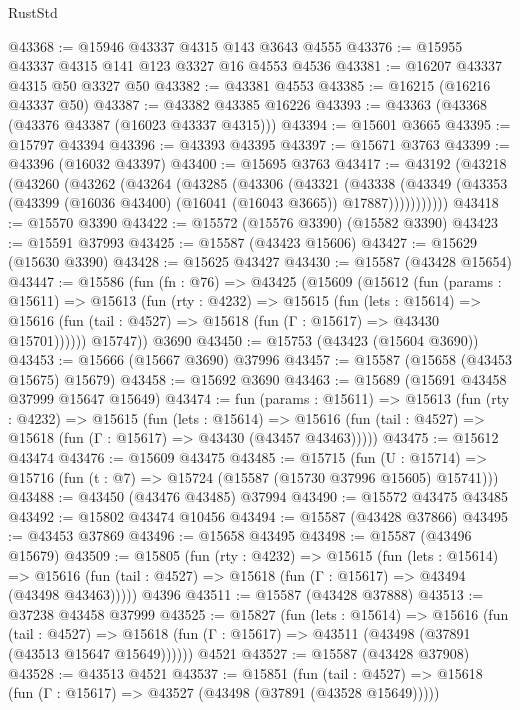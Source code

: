 \begin{lexlean}{RustStd}
\begin{coremodule}
@43368 := @15946 @43337 @4315 @143 @3643 @4555
@43376 := @15955 @43337 @4315 @141 @123 @3327 @16 @4553 @4536
@43381 := @16207 @43337 @4315 @50 @3327 @50
@43382 := @43381 @4553
@43385 := @16215 (@16216 @43337 @50)
@43387 := @43382 @43385 @16226
@43393 := @43363 (@43368 (@43376 @43387 (@16023 @43337 @4315)))
@43394 := @15601 @3665
@43395 := @15797 @43394
@43396 := @43393 @43395
@43397 := @15671 @3763
@43399 := @43396 (@16032 @43397)
@43400 := @15695 @3763
@43417 := @43192
    (@43218
      (@43260
        (@43262
          (@43264
            (@43285
              (@43306
                (@43321
                  (@43338
                    (@43349
                      (@43353 (@43399 (@16036 @43400) (@16041 (@16043 @3665)) @17887)))))))))))
@43418 := @15570 @3390
@43422 := @15572 (@15576 @3390) (@15582 @3390)
@43423 := @15591 @37993
@43425 := @15587 (@43423 @15606)
@43427 := @15629 (@15630 @3390)
@43428 := @15625 @43427
@43430 := @15587 (@43428 @15654)
@43447 := @15586
    (fun (fn : @76) =>
    @43425
      (@15609
        (@15612
          (fun (params : @15611) =>
          @15613
            (fun (rty : @4232) =>
            @15615
              (fun (lets : @15614) =>
              @15616 (fun (tail : @4527) => @15618 (fun (Γ : @15617) => @43430 @15701))))))
        @15747))
    @3690
@43450 := @15753 (@43423 (@15604 @3690))
@43453 := @15666 (@15667 @3690) @37996
@43457 := @15587 (@15658 (@43453 @15675) @15679)
@43458 := @15692 @3690
@43463 := @15689 (@15691 @43458 @37999 @15647 @15649)
@43474 := fun (params : @15611) =>
  @15613
    (fun (rty : @4232) =>
    @15615
      (fun (lets : @15614) =>
      @15616 (fun (tail : @4527) => @15618 (fun (Γ : @15617) => @43430 (@43457 @43463)))))
@43475 := @15612 @43474
@43476 := @15609 @43475
@43485 := @15715
    (fun (U : @15714) => @15716 (fun (t : @7) => @15724 (@15587 (@15730 @37996 @15605) @15741)))
@43488 := @43450 (@43476 @43485) @37994
@43490 := @15572 @43475 @43485
@43492 := @15802 @43474 @10456
@43494 := @15587 (@43428 @37866)
@43495 := @43453 @37869
@43496 := @15658 @43495
@43498 := @15587 (@43496 @15679)
@43509 := @15805
    (fun (rty : @4232) =>
    @15615
      (fun (lets : @15614) =>
      @15616 (fun (tail : @4527) => @15618 (fun (Γ : @15617) => @43494 (@43498 @43463)))))
    @4396
@43511 := @15587 (@43428 @37888)
@43513 := @37238 @43458 @37999
@43525 := @15827
    (fun (lets : @15614) =>
    @15616
      (fun (tail : @4527) =>
      @15618 (fun (Γ : @15617) => @43511 (@43498 (@37891 (@43513 @15647 @15649))))))
    @4521
@43527 := @15587 (@43428 @37908)
@43528 := @43513 @4521
@43537 := @15851
    (fun (tail : @4527) => @15618 (fun (Γ : @15617) => @43527 (@43498 (@37891 (@43528 @15649)))))

\end{coremodule}
\end{lexlean}

